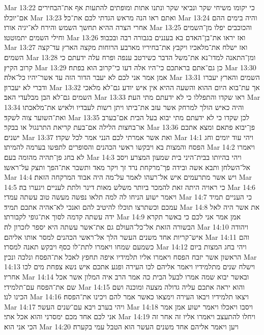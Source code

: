 Mar 13:22  כי יקומו משיחי שקר ונביאי שקר ונתנו אתות ומופתים להתעות אף את־הבחירים אם־יוכלו׃
Mar 13:23  ואתם ראו הנה מראש הגדתי לכם את־כל׃
Mar 13:24  והיה בימים ההם אחרי הצרה ההיא תחשך השמש והירח לא־יגיה אורו׃
Mar 13:25  והכוכבים יפלו מן־השמים וחילי השמים יתמוטטו׃
Mar 13:26  ואז יראו את־בן־האדם בא בעננים בגבורה רבה ובכבוד׃
Mar 13:27  ואז ישלח את־מלאכיו ויקבץ את־בחיריו מארבע הרוחות מקצה הארץ עד־קצה השמים׃
Mar 13:28  ומן־התאנה למדו־נא את־משל הדבר כשירטב ענפה ופרח עלה ידעתם כי קרוב הקיץ׃
Mar 13:29  כן גם־אתם בראתכם כי־היו אלה דעו כי־קרוב הוא בפתח׃
Mar 13:30  אמן אמר אני לכם לא יעבר הדור הזה עד אשר־יהיו כל־אלה׃
Mar 13:31  השמים והארץ יעברו ודברי לא יעברון׃
Mar 13:32  אך עת־בוא היום ההוא והשעה ההיא אין איש יודע גם־לא מלאכי השמים גם־לא הבן מבלעדי האב׃
Mar 13:33  ראו שקדו והתפללו כי לא ידעתם מתי העת׃
Mar 13:34  והיה כאיש הולך למרחק אשר עזב את־ביתו ויתן רשות לעבדיו ולאיש את־מלאכתו ואת־השוער צוה לשקד׃
Mar 13:35  לכן שקדו כי לא ידעתם מתי יבוא בעל הבית אם־בערב או־בחצות הלילה אם־בעת קריאת התרנגול או בבקר׃
Mar 13:36  פן־יבוא פתאם ומצא אתכם ישנים׃
Mar 13:37  ואת אשר אמרתי לכם הנני אמר לכל שקדו׃
Mar 14:1  ויהי עוד יומים וחג הפסח והמצות בא ויבקשו ראשי הכהנים והסופרים לתפשו בערמה להמיתו׃
Mar 14:2  ויאמרו לא בחג פן־תהיה מהומה בעם׃
Mar 14:3  ויהי בהיותו בבית־היני בית שמעון המצרע ויסב אל־השלחן ותבא אשה ובידה פך־מרקחת נרד זך ויקר מאד ותשבר את־הפך ותצק על־ראשו׃
Mar 14:4  ויש אשר מתרעמים איש אל־רעהו לאמר על־מה היה אבוד המרקחה הזאת׃
Mar 14:5  כי ראויה היתה זאת להמכר ביותר משלש מאות דינר ולתת לעניים ויגערו בה׃
Mar 14:6  ויאמר ישוע הניחו לה למה תלאו נפשה מעשה טוב עשתה עמדי׃
Mar 14:7  כי העניים תמיד עמכם וכשתרצו תוכלו להיטיב להם ואנכי לא־אהיה אתכם תמיד׃
Mar 14:8  את אשר היה לאל ידה עשתה קדמה לסוך את־גופי לקבורתו׃
Mar 14:9  אמן אמר אני לכם כי באשר תקרא הבשורה הזאת אל־כל־העולם גם את־אשר עשתה היא יספר לזכרון לה׃
Mar 14:10  ויהודה איש־קריות אחד משנים העשר הלך אל־ראשי הכהנים למסר אותו אליהם׃
Mar 14:11  והם כשמעם שמחו ויאמרו לתת־לו כסף ויבקש תאנה למסרו׃
Mar 14:12  ויהי בחג המצות ביום הראשון אשר יזבח הפסח ויאמרו אליו תלמידיו איפה תחפץ לאכל את־הפסח ונלכה ונכין׃
Mar 14:13  וישלח שנים מתלמידיו ויאמר אליהם לכו העירה ופגע אתכם איש נשא צפחת מים לכו אחריו׃
Mar 14:14  ובאשר יבוא שמה אמרו לבעל הבית כה אמר הרב איה המלון אשר אכל שם את־הפסח עם־תלמידי׃
Mar 14:15  והוא יראה אתכם עליה גדולה מצעה ומוכנה ושם הכינו לנו׃
Mar 14:16  ויצאו תלמידיו ויבאו העירה וימצאו כאשר אמר להם ויכינו את־הפסח׃
Mar 14:17  ויהי בערב ויבא עם־שנים העשר׃
Mar 14:18  ויסבו ויאכלו ויאמר ישוע אמן אמר אני לכם אחד מכם ימסרני והוא אכל אתי׃
Mar 14:19  ויחלו להתעצב ויאמרו אליו זה אחר זה הכי אני הוא׃
Mar 14:20  ויען ויאמר אליהם אחד משנים העשר הוא הטבל עמי בקערה׃
